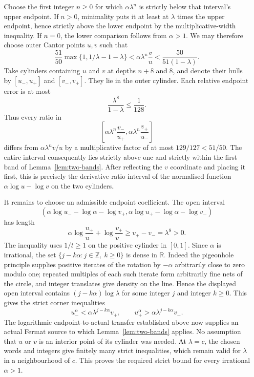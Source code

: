 Choose the first integer $n\ge0$ for which $\alpha\lambda^n$ is strictly below that interval's upper endpoint. If $n>0$, minimality puts it at least at $\lambda$ times the upper endpoint, hence strictly above the lower endpoint by the multiplicative-width inequality. If $n=0$, the lower comparison follows from $\alpha>1$. We may therefore choose outer Cantor points $u,v$ such that
\[
\frac{51}{50}\max\{1,1/\lambda-1-\lambda\}
<\alpha\lambda^n\frac vu
<\frac{50}{51(1-\lambda)}.
\]
Take cylinders containing $u$ and $v$ at depths $n+8$ and $8$, and denote their hulls by $[u_-,u_+]$ and $[v_-,v_+]$. They lie in the outer cylinder. Each relative endpoint error is at most
\[
\frac{\lambda^8}{1-\lambda}\le\frac1{128}.
\]
Thus every ratio in
\[
\left[\alpha\lambda^n\frac{v_-}{u_+},
      \alpha\lambda^n\frac{v_+}{u_-}\right]
\]
differs from $\alpha\lambda^n v/u$ by a multiplicative factor of at most $129/127<51/50$. The entire interval consequently lies strictly above one and strictly within the first band of Lemma~\ref{lem:two-bands}. After reflecting the $v$ coordinate and placing it first, this is precisely the derivative-ratio interval of the normalised function $\alpha\log u-\log v$ on the two cylinders.

It remains to choose an admissible endpoint coefficient. The open interval
\[
\left(
\alpha\log u_- -\log\alpha-\log v_+,
\alpha\log u_+ -\log\alpha-\log v_-
\right)
\]
has length
\[
\alpha\log\frac{u_+}{u_-}+\log\frac{v_+}{v_-}
\ge v_+-v_-=\lambda^8>0.
\]
The inequality uses $1/t\ge1$ on the positive cylinder in $[0,1]$. Since $\alpha$ is irrational, the set $\{j-k\alpha:j\in\mathbb Z,\ k\ge0\}$ is dense in $\mathbb R$. Indeed the pigeonhole principle supplies positive iterates of the rotation by $-\alpha$ arbitrarily close to zero modulo one; repeated multiples of each such iterate form arbitrarily fine nets of the circle, and integer translates give density on the line. Hence the displayed open interval contains $(j-k\alpha)\log\lambda$ for some integer $j$ and integer $k\ge0$.
This gives the strict corner inequalities
\[
u_-^\alpha<\alpha\lambda^{j-k\alpha}v_+,
\qquad u_+^\alpha>\alpha\lambda^{j-k\alpha}v_-.
\]
The logarithmic endpoint-to-actual transfer established above now supplies an actual Fermat source to which Lemma~\ref{lem:two-bands} applies. No assumption that $u$ or $v$ is an interior point of its cylinder was needed. At $\lambda=c$, the chosen words and integers give finitely many strict inequalities, which remain valid for $\lambda$ in a neighbourhood of $c$. This proves the required strict bound for every irrational $\alpha>1$.
